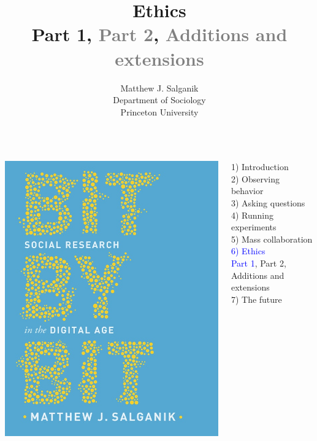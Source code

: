 \documentclass{beamer}
\title[]{Ethics\\Part 1, \textcolor{gray}{Part 2}, \textcolor{gray}{Additions and extensions}}
\author[]{Matthew J. Salganik\\Department of Sociology\\Princeton University}
\date[]{Summer Institutes in Computational Social Science\\Day 1\\2020
\vfill
\begin{flushleft}
{\scriptsize
The Summer Institutes in Computational Social Science is supported by grants from the Russell Sage Foundation, Alfred P. Sloan Foundation, Facebook, and the Social Science Research Council.}
\end{flushleft}
\begin{flushright}
\texttt{[image: figures/cc-by.png]}
\end{flushright}
}
\begin{document}
\frame{\titlepage}
\begin{frame}

\begin{columns}
\begin{column}{.40\textwidth}
\includegraphics[width=\textwidth]{figures/salganik_bit_2018_cover}
\end{column}%

\hfill%

\begin{column}{.60\textwidth}
1) Introduction \\
2) Observing behavior \\
3) Asking questions \\
4) Running experiments \\
5) Mass collaboration \\
\textcolor{blue}{6) Ethics} \\
\textcolor{blue}{Part 1}, Part 2, Additions and extensions \\
7) The future \\
\end{column}%
\end{columns}

\end{frame}
\end{document}
